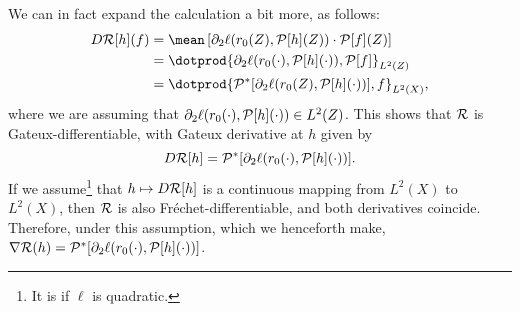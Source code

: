 We can in fact expand the calculation a bit more, as follows:
\begin{align*}
    D \risk [ h ] ( f )
    &= \mean \left[
        \partial_{ 2 } \ell ( r_{ 0 } ( Z ), \meanop [ h ] ( Z ) ) \cdot \meanop [ f ] ( Z )
    \right] \\
    &= \dotprod{ \partial_{ 2 } \ell ( r_{ 0 } ( \cdot ), \meanop [ h ] ( \cdot ) ), \meanop [ f ] }_{ L^{ 2 } ( Z ) } \\
    &= \dotprod{ \meanop^{ * } [ \partial_{ 2 } \ell ( r_{ 0 } ( Z ), \meanop [ h ] ( \cdot ) ) ], f }_{ L^{ 2 } ( X ) }
,\end{align*}
where we are assuming that $ \partial_{ 2 } \ell ( r_{ 0 } ( \cdot ), \mathcal{P} [ h ] ( \cdot ) ) \in L^{ 2 } ( Z ) $.
This shows that $ \mathcal{R} $ is Gateux-differentiable, with Gateux derivative at $ h $ given by
\begin{equation*}
    D \mathcal{R} [ h ] = \mathcal{P}^{ * } [ \partial_{ 2 } \ell ( r_{ 0 } ( \cdot ), \mathcal{P} [ h ] ( \cdot ) ) ]
.\end{equation*}
If we assume\footnote{It is if $ \ell $ is quadratic.} that $ h \mapsto D \mathcal{R} [ h ] $ is a continuous mapping from $ L^{ 2 } ( X ) $ to $ L^{ 2 } ( X ) $, then $ \mathcal{R} $ is also Fréchet-differentiable, and both derivatives coincide.
Therefore, under this assumption, which we henceforth make, $ \nabla \mathcal{R} ( h ) = \mathcal{P}^{ * } [ \partial_{ 2 } \ell ( r_{ 0 } ( \cdot ), \mathcal{P} [ h ] ( \cdot ) ) ] $.
